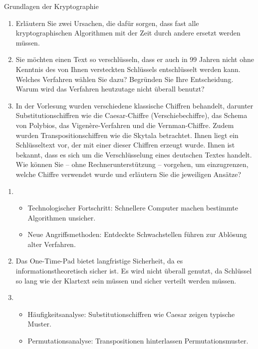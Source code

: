 \documentclass{article}
\begin{document}
\begin{exercise}{Grundlagen der Kryptographie}
  \begin{enumerate}
      \item Erläutern Sie zwei Ursachen, die dafür sorgen, dass fast alle kryptographischen Algorithmen mit der Zeit durch andere ersetzt werden müssen.
      \item Sie möchten einen Text so verschlüsseln, dass er auch in 99 Jahren nicht ohne Kenntnis des von Ihnen versteckten Schlüssels entschlüsselt werden kann. Welches Verfahren wählen Sie dazu? Begründen Sie Ihre Entscheidung. Warum wird das Verfahren heutzutage nicht überall benutzt?
      \item In der Vorlesung wurden verschiedene klassische Chiffren behandelt, darunter Substitutionschiffren wie die Caesar-Chiffre (Verschiebechiffre), das Schema von Polybios, das Vigenère-Verfahren und die Vernman-Chiffre. Zudem wurden Transpositionschiffren wie die Skytala betrachtet. Ihnen liegt ein Schlüsseltext vor, der mit einer dieser Chiffren erzeugt wurde. Ihnen ist bekannt, dass es sich um die Verschlüsselung eines deutschen Textes handelt. Wie können Sie – ohne Rechnerunterstützung – vorgehen, um einzugrenzen, welche Chiffre verwendet wurde und erläutern Sie die jeweiligen Ansätze?
  \end{enumerate}

  \begin{solution}
    \begin{enumerate}
        \item \begin{itemize}
            \item Technologischer Fortschritt: Schnellere Computer machen bestimmte Algorithmen unsicher.
            \item Neue Angriffsmethoden: Entdeckte Schwachstellen führen zur Ablösung alter Verfahren.
          \end{itemize}
        \item Das One-Time-Pad bietet langfristige Sicherheit, da es informationstheoretisch sicher ist. Es wird nicht überall genutzt, da Schlüssel so lang wie der Klartext sein müssen und sicher verteilt werden müssen.
        \item \begin{itemize}
            \item Häufigkeitsanalyse: Substitutionschiffren wie Caesar zeigen typische Muster.
            \item Permutationsanalyse: Transpositionen hinterlassen Permutationsmuster.
        \end{itemize}
    \end{enumerate}
  \end{solution}
\end{exercise}
\end{document}
